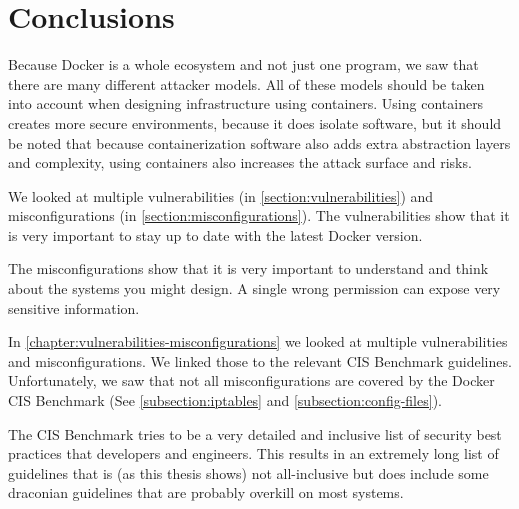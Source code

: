 \chapter{Conclusions}
Because Docker is a whole ecosystem and not just one program, we saw that there are many different attacker models. All of these models should be taken into account when designing infrastructure using containers. Using containers creates more secure environments, because it does isolate software, but it should be noted that because containerization software also adds extra abstraction layers and complexity, using containers also increases the attack surface and risks.

\hfill

We looked at multiple vulnerabilities (in \autoref{section:vulnerabilities}) and misconfigurations (in \autoref{section:misconfigurations}). The vulnerabilities show that it is very important to stay up to date with the latest Docker version.

The misconfigurations show that it is very important to understand and think about the systems you might design. A single wrong permission can expose very sensitive information.

\hfill

In \autoref{chapter:vulnerabilities-misconfigurations} we looked at multiple vulnerabilities and misconfigurations. We linked those to the relevant CIS Benchmark guidelines. Unfortunately, we saw that not all misconfigurations are covered by the Docker CIS Benchmark (See \autoref{subsection:iptables} and \autoref{subsection:config-files}).

The CIS Benchmark tries to be a very detailed and inclusive list of security best practices that developers and engineers. This results in an extremely long list of guidelines that is (as this thesis shows) not all-inclusive but does include some draconian guidelines that are probably overkill on most systems.
